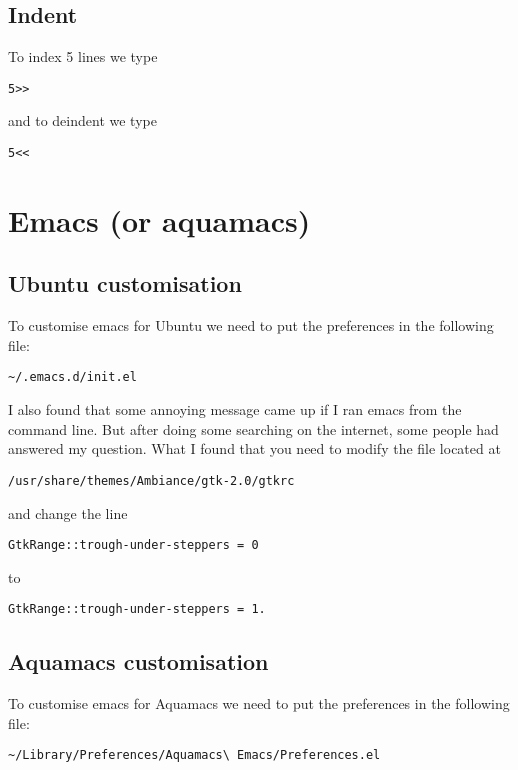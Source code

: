 \documentclass[a4paper, 10pt]{article}
\begin{document}
\subsection*{Indent}
To index 5 lines we type
\begin{verbatim}
5>>
 \end{verbatim}
and to deindent we type
\begin{verbatim}
5<<
 \end{verbatim}

\section*{Emacs (or aquamacs)}

\subsection*{Ubuntu customisation}
\label{sec:ubuntu-customisation}

To customise emacs for Ubuntu we need to put the preferences in the
following file:
\begin{verbatim}
~/.emacs.d/init.el
\end{verbatim}

I also found that some annoying message came up if I ran emacs from
the command line. But after doing some searching on the internet, some
people had answered my question. What I found that you need to modify
the file located at
\begin{verbatim}
/usr/share/themes/Ambiance/gtk-2.0/gtkrc
\end{verbatim}
and change the line 
\begin{verbatim}
GtkRange::trough-under-steppers = 0
\end{verbatim}
to 
\begin{verbatim}
GtkRange::trough-under-steppers = 1.
\end{verbatim}



\subsection*{Aquamacs customisation}
\label{sec:ubuntu-customisation}

To customise emacs for Aquamacs we need to put the preferences in the
following file:
\begin{verbatim}
~/Library/Preferences/Aquamacs\ Emacs/Preferences.el
\end{verbatim}
\end{document}
